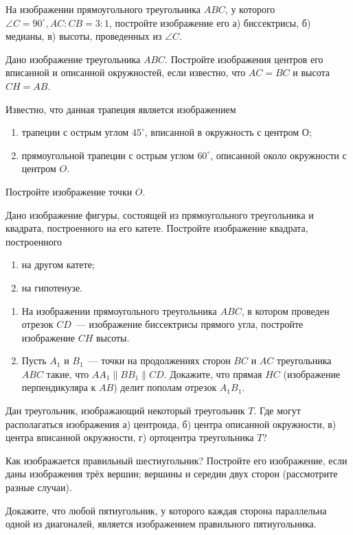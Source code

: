 \documentclass{article}
\begin{document}
\begin{enumerate_boxed}
        \item На изображении прямоугольного треугольника $ABC$, у которого $\angle C=90^\circ, AC:CB=3:1$, постройте изображение его а) биссектрисы, б) медианы, в) высоты, проведенных из $\angle C$.
        \item Дано изображение треугольника $ABC$.
        Постройте изображения центров его вписанной и описанной окружностей, если известно, что $AC = BC$ и высота $CH = AB$.
        \item Известно, что данная трапеция является изображением
        \begin{enumerate}
            \item трапеции с острым углом $45^\circ$, вписанной в окружность с центром О;
            \item прямоугольной трапеции с острым углом $60^\circ$, описанной около окружности с центром $O$.
        \end{enumerate}
        Постройте изображение точки $O$.
        \item Дано изображение фигуры, состоящей из прямоугольного треугольника и квадрата, построенного на его катете.
        Постройте изображение квадрата, построенного
        \begin{enumerate}
            \item на другом катете;
            \item на гипотенузе.
        \end{enumerate}
        \item
        \begin{enumerate}
            \item На изображении прямоугольного треугольника $ABC$, в котором проведен отрезок $CD$~--- изображение биссектрисы прямого угла, постройте изображение $CH$ высоты.
            \item Пусть $A_1$ и $B_1$~--- точки на продолжениях сторон $BC$ и $AC$ треугольника $ABC$ такие, что $AA_1 \parallel BB_1 \parallel CD$.
            Докажите, что прямая $HC$ (изображение перпендикуляра к $AB$) делит пополам отрезок $A_{1}B_1$.
        \end{enumerate}
        \item Дан треугольник, изображающий некоторый треугольник $T$.
        Где могут располагаться изображения а) центроида, б) центра описанной окружности, в) центра вписанной окружности, г) ортоцентра треугольника $T$?
        \item Как изображается правильный шестиугольник?
        Постройте его изображение, если даны изображения трёх вершин; вершины и середин двух сторон (рассмотрите разные случаи).
        \item Докажите, что любой пятиугольник, у которого каждая сторона параллельна одной из диагоналей, является изображением правильного пятиугольника.


\end{enumerate_boxed}
\end{document}
